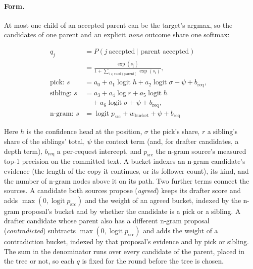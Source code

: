 \documentclass[10pt,twocolumn,letterpaper]{article}
\DeclareMathOperator{\logit}{logit}
\begin{document}
\paragraph{Form.} At most one child of an accepted parent can be the target's argmax, so the candidates of one parent and an explicit \emph{none} outcome share one softmax:

\begin{equation}\label{eq:6}
\begin{aligned}
q_j &= P(j\ \text{accepted} \mid \text{parent accepted})\\
    &= \frac{\exp(s_j)}{1 + \sum_{i \in \mathrm{cand}(\mathrm{parent})} \exp(s_i)},\\[2pt]
\text{pick: } s &= a_0 + a_1\logit h + a_2\logit\sigma + \psi + b_{\mathrm{req}},\\
\text{sibling: } s &= a_3 + a_4\log r + a_5\logit h\\
    &\quad + a_6\logit\sigma + \psi + b_{\mathrm{req}},\\
\text{n-gram: } s &= \logit p_{\mathrm{src}} + w_{\mathrm{bucket}} + \psi + b_{\mathrm{req}}
\end{aligned}
\end{equation}

Here $h$ is the confidence head at the position, $\sigma$ the pick's share, $r$ a sibling's share of the siblings' total, $\psi$ the context term (and, for drafter candidates, a depth term), $b_{\mathrm{req}}$ a per-request intercept, and $p_{\mathrm{src}}$ the n-gram source's measured top-1 precision on the committed text. A bucket indexes an n-gram candidate's evidence (the length of the copy it continues, or its follower count), its kind, and the number of n-gram nodes above it on its path. Two further terms connect the sources. A candidate both sources propose (\emph{agreed}) keeps its drafter score and adds $\max(0, \logit p_{\mathrm{src}})$ and the weight of an agreed bucket, indexed by the n-gram proposal's bucket and by whether the candidate is a pick or a sibling. A drafter candidate whose parent also has a different n-gram proposal (\emph{contradicted}) subtracts $\max(0, \logit p_{\mathrm{src}})$ and adds the weight of a contradiction bucket, indexed by that proposal's evidence and by pick or sibling. The sum in the denominator runs over every candidate of the parent, placed in the tree or not, so each $q$ is fixed for the round before the tree is chosen.
\end{document}
